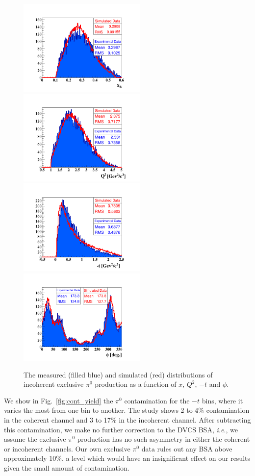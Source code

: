 \documentclass{article}
\begin{document}
\begin{figure}[p]
\center
\includegraphics[trim=70 15 70 70,clip,width=6.3cm]{fig3/pi0/xB_InCoh_pi0.png}
\includegraphics[trim=70 15 70 70,clip,width=6.3cm]{fig3/pi0/Q2_InCoh_pi0.png}
\includegraphics[trim=70 15 70 70,clip,width=6.3cm]{fig3/pi0/t_InCoh_pi0.png}
\includegraphics[trim=70 15 70 70,clip,width=6.3cm]{fig3/pi0/phi_h_InCoh_pi0.png}
	\caption{The measured (filled blue) and simulated (red) distributions of
	incoherent exclusive $\pi^0$ production as a function of $x$, $Q^2$, $-t$ and $\phi$.}
\label{fig:InCohPi0Simul}
\end{figure}


We show in Fig.~\ref{fig:cont_yield} the $\pi^0$ contamination for the $-t$ bins, where it varies
the most from one bin to another. The study
shows 2 to 4\% contamination in the coherent channel and 3 to 17\% in the incoherent
channel. After subtracting this contamination, we make no further correction to 
the DVCS BSA, \textit{i.e}., we assume the exclusive $\pi^0$ production has no such 
asymmetry in either the coherent or incoherent channels. Our own exclusive $\pi^0$ 
data rules out any BSA above approximately 10\%, a level which would have an 
insignificant effect on our results given the small amount of contamination.
\end{document}
